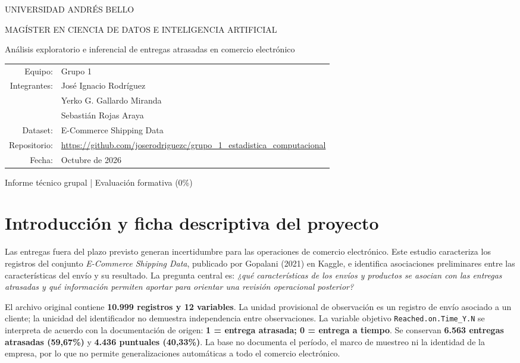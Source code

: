 \documentclass[11pt,a4paper]{article}
\begin{document}
\begin{titlepage}\centering\vspace*{2cm}
{\large UNIVERSIDAD ANDRÉS BELLO\par}\vspace{.5cm}
{\Large MAGÍSTER EN CIENCIA DE DATOS E INTELIGENCIA ARTIFICIAL\par}
\vspace{1.2cm}{\large MCDI501: Estadística Computacional para la Toma de Decisiones\par}
\vspace{2cm}{\Huge\bfseries Evaluación Formativa 1\par}\vspace{.4cm}
{\LARGE Análisis exploratorio e inferencial de entregas atrasadas en comercio electrónico\par}
\vfill\begin{tabular}{rl}Equipo:& Grupo 1\\Integrantes:& José Ignacio Rodríguez\\& Yerko G. Gallardo Miranda\\& Sebastián Rojas Araya\\Dataset:& E-Commerce Shipping Data\\Repositorio:& \multicolumn{1}{l}{\url{https://github.com/joserodriguezc/grupo_1_estadistica_computacional}}\\Fecha:& Octubre de 2026\end{tabular}
\vspace{1.6cm}\par{\large Informe técnico grupal | Evaluación formativa (0\%)}\end{titlepage}
\tableofcontents\newpage
\section{Introducción y ficha descriptiva del proyecto}
Las entregas fuera del plazo previsto generan incertidumbre para las operaciones de comercio electrónico. Este estudio caracteriza los registros del conjunto \emph{E-Commerce Shipping Data}, publicado por Gopalani (2021) en Kaggle, e identifica asociaciones preliminares entre las características del envío y su resultado. La pregunta central es: \emph{¿qué características de los envíos y productos se asocian con las entregas atrasadas y qué información permiten aportar para orientar una revisión operacional posterior?}

El archivo original contiene \textbf{10.999 registros y 12 variables}. La unidad provisional de observación es un registro de envío asociado a un cliente; la unicidad del identificador no demuestra independencia entre observaciones. La variable objetivo \texttt{Reached.on.Time\_Y.N} se interpreta de acuerdo con la documentación de origen: \textbf{1 = entrega atrasada; 0 = entrega a tiempo}. Se conservan \textbf{6.563 entregas atrasadas (59,67\%)} y \textbf{4.436 puntuales (40,33\%)}. La base no documenta el período, el marco de muestreo ni la identidad de la empresa, por lo que no permite generalizaciones automáticas a todo el comercio electrónico.
\end{document}
